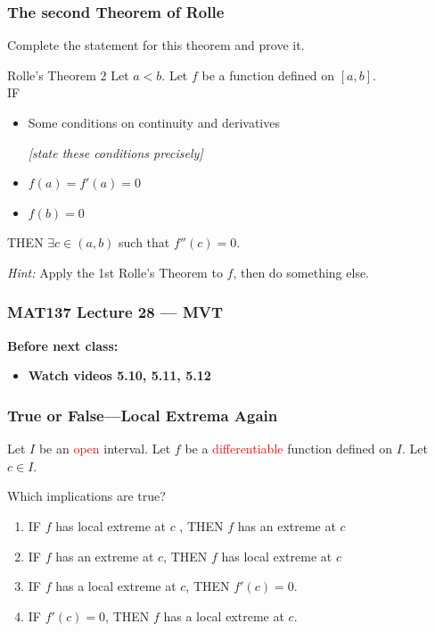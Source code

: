 \documentclass[14pt]{beamer}
\begin{document}
	\begin{frame}[t]
		\frametitle{The second Theorem of Rolle}

		Complete the statement for this theorem and prove it.

		\vfill

		\begin{block}{Rolle's Theorem 2}
			Let $a<b$. Let $f$ be a function defined on $[a,b]$. \\ IF
			\begin{itemize}
				\item Some conditions on continuity and derivatives

					\emph{[state these conditions precisely]}

				\item $\displaystyle f(a) = f'(a) =0$

				\item $\displaystyle f(b)=0$
			\end{itemize}
			THEN $\displaystyle \exists c \in (a,b)$ such that $\displaystyle f''(c)=0$.
		\end{block}

		\vfill

		\emph{Hint:} Apply the 1st Rolle's Theorem to $f$, then do something else.
	\end{frame}















\begin{frame}
	\frametitle{MAT137 Lecture 28 --- MVT}

	\vfill
	{\bf Before next class:}
		\begin{itemize} \normalsize
			\item {\bf Watch videos  5.10, 5.11, 5.12}
		\end{itemize}
\end{frame}

	\begin{frame}[t]
		\frametitle{True or False---Local Extrema Again}

		Let $I$ be an \textcolor{red}{open} interval. Let $f$ be a \textcolor{red}{differentiable}
		function defined on $I$. Let $c\in I$.

		Which implications are true?
		\begin{enumerate}
			\item IF $f$ has local extreme at $c$ , THEN $f$ has an extreme at $c$
			\item IF $f$ has an extreme at $c$, THEN $f$ has local extreme at $c$
			\item IF $f$ has a local extreme at $c$, THEN $f' (c ) = 0$.
			\item IF $f'(c ) = 0$, THEN $f$ has a local extreme at $c$.
		\end{enumerate}

	\end{frame}
\end{document}
